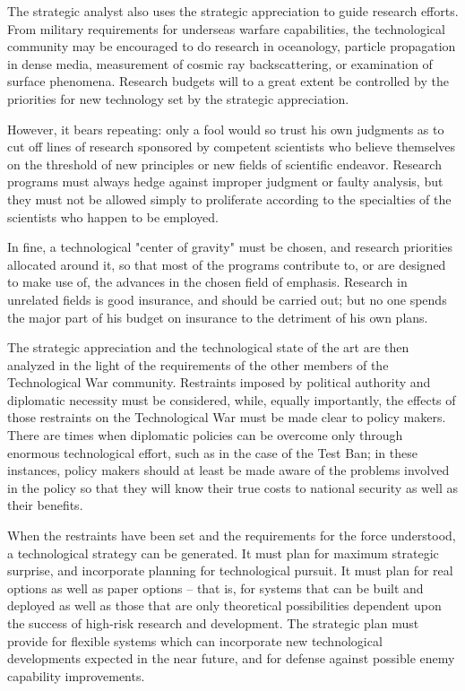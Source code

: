 The strategic analyst also uses the strategic appreciation to guide research efforts. From military requirements for underseas warfare capabilities, the technological community may be encouraged to do research in oceanology, particle propagation in dense media, measurement of cosmic ray backscattering, or examination of surface phenomena. Research budgets will to a great extent be controlled by the priorities for new technology set by the strategic appreciation.

However, it bears repeating: only a fool would so trust his own judgments as to cut off lines of research sponsored by competent scientists who believe themselves on the threshold of new principles or new fields of scientific endeavor. Research programs must always hedge against improper judgment or faulty analysis, but they must not be allowed simply to proliferate according to the specialties of the scientists who happen to be employed.

In fine, a technological "center of gravity" must be chosen, and research priorities allocated around it, so that most of the programs contribute to, or are designed to make use of, the advances in the chosen field of emphasis. Research in unrelated fields is good insurance, and should be carried out; but no one spends the major part of his budget on insurance to the detriment of his own plans.

The strategic appreciation and the technological state of the art are then analyzed in the light of the requirements of the other members of the Technological War community. Restraints imposed by political authority and diplomatic necessity must be considered, while, equally importantly, the effects of those restraints on the Technological War must be made clear to policy makers. There are times when diplomatic policies can be overcome only through enormous technological effort, such as in the case of the Test Ban; in these instances, policy makers should at least be made aware of the problems involved in the policy so that they will know their true costs to national security as well as their benefits.

When the restraints have been set and the requirements for the force understood, a technological strategy can be generated. It must plan for maximum strategic surprise, and incorporate planning for technological pursuit. It must plan for real options as well as paper options -- that is, for systems that can be built and deployed as well as those that are only theoretical possibilities dependent upon the success of high-risk research and development. The strategic plan must provide for flexible systems which can incorporate new technological developments expected in the near future, and for defense against possible enemy capability improvements.

